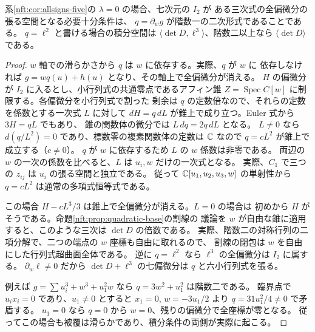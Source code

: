 \begin{proposition}[零係数の全ファイバーでの積分条件]\label{nft:prop:sign-integration}
系\ref{nft:cor:allsigns-five}の $\lambda=0$ の場合、七次元の $I_2$ が
ある三次式の全偏微分の張る空間となる必要十分条件は、
$q=\partial_w g$ が階数一の二次形式であることである。
$q=\ell^2$ と書ける場合の積分空間は
$\langle\det D,\ell^3\rangle$、階数二以上なら $\langle\det D\rangle$ である。
\end{proposition}
\begin{proof}
$w$ 軸での滑らかさから $q$ は $w$ に依存する。実際、$q$ が $w$ に
依存しなければ $g=wq(u)+h(u)$ となり、その軸上で全偏微分が消える。
$H$ の偏微分が $I_2$ に入るとし、小行列式の共通零点であるアフィン錐
$Z=\operatorname{Spec}C[w]$ に制限する。各偏微分を小行列式で割った
剰余は $q$ の定数倍なので、それらの定数を係数とする一次式 $L$ に対して
$dH=q\,dL$ が錐上で成り立つ。Euler 式から $3H=qL$ でもあり、
錐の関数体の微分では $L\,dq=2q\,dL$ となる。
$L\ne0$ なら $d(q/L^2)=0$ であり、標数零の複素関数体の定数は
$\mathbb C$ なので $q=cL^2$ が錐上で成立する（$c\ne0$）。
$q$ が $w$ に依存するため $L$ の $w$ 係数は非零である。
両辺の $w$ の一次の係数を比べると、$L$ は $u_i,w$ だけの一次式となる。
実際、$C_1$ で三つの $z_{ij}$ は $u_i$ の張る空間と独立である。
従って $\mathbb C[u_1,u_2,u_3,w]$ の単射性から $q=cL^2$ は通常の多項式恒等式である。

この場合 $H-cL^3/3$ は錐上で全偏微分が消える。$L=0$ の場合は
初めから $H$ がそうである。命題\ref{nft:prop:quadratic-base}の割線の
議論を $w$ が自由な錐に適用すると、このような三次は $\det D$ の倍数である。
実際、階数二の対称行列の二項分解で、二つの端点の $w$ 座標も自由に取れるので、
割線の閉包は $w$ を自由にした行列式超曲面全体である。
逆に $q=\ell^2$ なら $\ell^3$ の全偏微分は $I_2$ に属する。
$\partial_w\ell\ne0$ だから $\det D+\ell^3$ の七偏微分は
$q$ と六小行列式を張る。

例えば $g=\sum u_i^3+w^3+u_1^2 w$ なら $q=3w^2+u_1^2$ は階数二である。
臨界点で $u_i x_i=0$ であり、$u_1\ne0$ とすると $x_1=0$,
$w=-3u_1/2$ より $q=31u_1^2/4\ne0$ で矛盾する。
$u_1=0$ なら $q=0$ から $w=0$、残りの偏微分で全座標が零となる。
従ってこの場合も被覆は滑らかであり、積分条件の両側が実際に起こる。
\end{proof}
